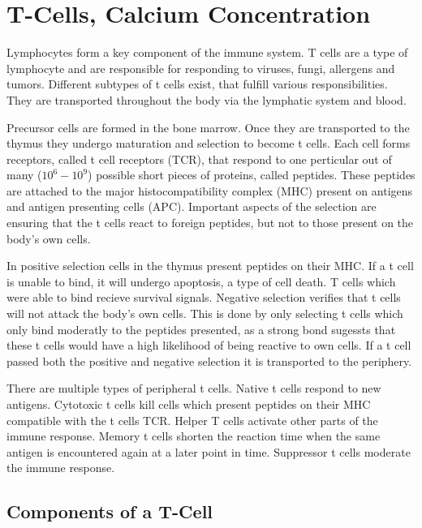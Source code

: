 \chapter{T-Cells, Calcium Concentration}
\label{chapter:t-cell}

Lymphocytes form a key component of the immune system. T cells are a type of lymphocyte and are responsible for responding to viruses, fungi, allergens and tumors. Different subtypes of t cells exist, that fulfill various responsibilities. They are transported throughout the body via the lymphatic system and blood.\cite{Kumar2018}

Precursor cells are formed in the bone marrow. Once they are transported to the thymus they undergo maturation and selection to become t cells. Each cell forms receptors, called t cell receptors (TCR), that respond to one perticular out of many ($10^6 - 10^9$) possible short pieces of proteins, called peptides. These peptides are attached to the major histocompatibility complex (MHC) present on antigens and antigen presenting cells (APC). Important aspects of the selection are ensuring that the t cells react to foreign peptides, but not to those present on the body's own cells.\cite{Ashby2024}

In positive selection cells in the thymus present peptides on their MHC. If a t cell is unable to bind, it will undergo apoptosis, a type of cell death. T cells which were able to bind recieve survival signals. Negative selection verifies that t cells will not attack the body's own cells. This is done by only selecting t cells which only bind moderatly to the peptides presented, as a strong bond sugessts that these t cells would have a high likelihood of being reactive to own cells.\cite{Hagel2018} If a t cell passed both the positive and negative selection it is transported to the periphery.

There are multiple types of peripheral t cells. Native t cells respond to new antigens. Cytotoxic t cells kill cells which present peptides on their MHC compatible with the t cells TCR. Helper T cells activate other parts of the immune response. Memory t cells shorten the reaction time when the same antigen is encountered again at a later point in time. Suppressor t cells moderate the immune response.\cite{Ganong1997}

\section{Components of a T-Cell}

